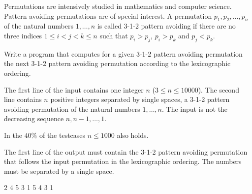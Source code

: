 

Permutations are intensively studied in mathematics and computer science. Pattern avoiding permutations are of special interest. A permutation $p_1,p_2, \ldots, p_n$ of the natural numbers $1,\ldots, n$ is called 3-1-2 pattern avoiding if there are no three indices $1\leq i<j<k \leq n$ such that $p_i>p_j$,  $p_i>p_k$ and $p_j<p_k$.

Write a program that computes for a given 3-1-2 pattern avoiding permutation the next
3-1-2 pattern avoiding permutation according to the lexicographic ordering.

The first line of the input contains one integer $n$ ($3 \leq n \leq 10000$). The second line contains $n$ positive integers separated by single spaces, a 3-1-2 pattern avoiding permutation of the natural numbers $1, \ldots, n$. The input is not the decreasing sequence $n,n-1,\ldots ,1$.

In the $40\%$ of the testcases  $n \leq 1000$ also holds.

The first line of the output must contain the 3-1-2 pattern avoiding permutation that follows the input permutation in the lexicographic ordering. The numbers must be separated by a single space.


2 4 5 3 1
 5 4 3 1
\sampleCOMMENT

\sampleEND
\bigskip

